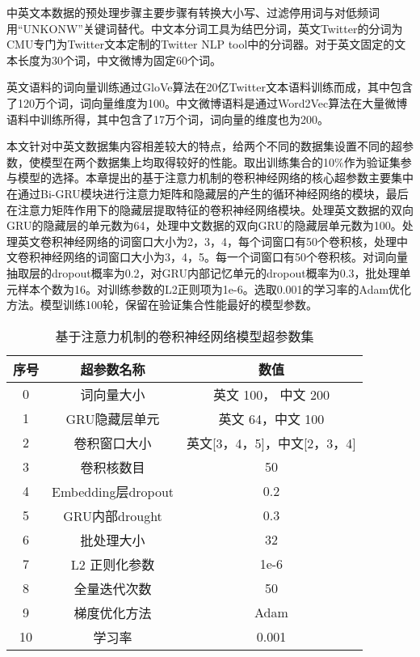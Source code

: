 中英文本数据的预处理步骤主要步骤有转换大小写、过滤停用词与对低频词用“UNKONW”关键词替代。中文本分词工具为结巴分词，英文Twitter的分词为CMU专门为Twitter文本定制的Twitter NLP tool中的分词器。对于英文固定的文本长度为30个词，中文微博为固定60个词。

英文语料的词向量训练通过GloVe算法在20亿Twitter文本语料训练而成，其中包含了120万个词，词向量维度为100。中文微博语料是通过Word2Vec算法在大量微博语料中训练所得，其中包含了17万个词，词向量的维度也为200。


本文针对中英文数据集内容相差较大的特点，给两个不同的数据集设置不同的超参数，使模型在两个数据集上均取得较好的性能。取出训练集合的10\%作为验证集参与模型的选择。本章提出的基于注意力机制的卷积神经网络的核心超参数主要集中在通过Bi-GRU模块进行注意力矩阵和隐藏层的产生的循环神经网络的模块，最后在注意力矩阵作用下的隐藏层提取特征的卷积神经网络模块。处理英文数据的双向GRU的隐藏层的单元数为64，处理中文数据的双向GRU的隐藏层单元数为100。处理英文卷积神经网络的词窗口大小为2，3，4，每个词窗口有50个卷积核，处理中文卷积神经网络的词窗口大小为3，4，5。每一个词窗口有50个卷积核。对词向量抽取层的dropout概率为0.2，对GRU内部记忆单元的dropout概率为0.3，批处理单元样本个数为16。对训练参数的L2正则项为1e-6。选取0.001的学习率的Adam优化方法。模型训练100轮，保留在验证集合性能最好的模型参数。

\begin{table}[htbp]
	\caption[param]{基于注意力机制的卷积神经网络模型超参数集}
	\label{param}
	\vspace{0.5em}\centering\wuhao
	\begin{tabular}{ccc}
		\toprule[1.5pt]
		序号& 超参数名称 &数值\\
		\midrule[1pt]
		0 &词向量大小& 英文 100， 中文 200\\
		1 &GRU隐藏层单元& 英文 64，中文 100\\
		2 &卷积窗口大小&英文[3，4，5]，中文[2，3，4]\\
		3 &卷积核数目& 50\\
		4 &Embedding层dropout& 0.2\\
		5 &GRU内部drought& 0.3\\
		6 &批处理大小& 32\\
		7 &L2 正则化参数 &1e-6\\
		8 &全量迭代次数& 50\\
		9 &梯度优化方法& Adam\\
		10 &学习率& 0.001\\
		\bottomrule[1.5pt]
	\end{tabular}
\end{table}

